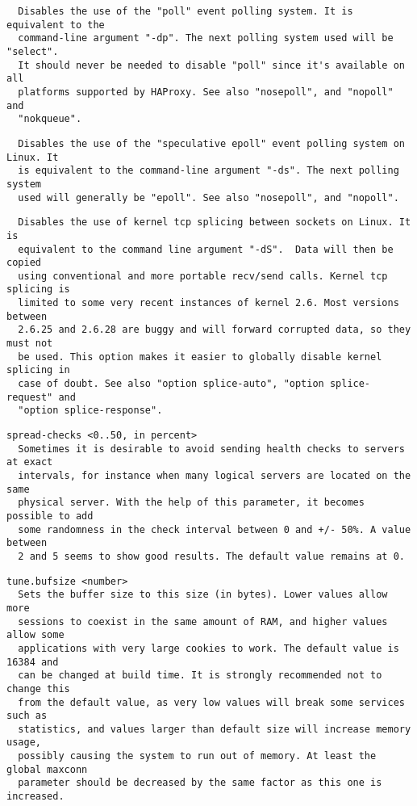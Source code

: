 \begin{verbatim}
  Disables the use of the "poll" event polling system. It is equivalent to the
  command-line argument "-dp". The next polling system used will be "select".
  It should never be needed to disable "poll" since it's available on all
  platforms supported by HAProxy. See also "nosepoll", and "nopoll" and
  "nokqueue".
\end{verbatim}

\begin{verbatim}
  Disables the use of the "speculative epoll" event polling system on Linux. It
  is equivalent to the command-line argument "-ds". The next polling system
  used will generally be "epoll". See also "nosepoll", and "nopoll".
\end{verbatim}

\begin{verbatim}
  Disables the use of kernel tcp splicing between sockets on Linux. It is
  equivalent to the command line argument "-dS".  Data will then be copied
  using conventional and more portable recv/send calls. Kernel tcp splicing is
  limited to some very recent instances of kernel 2.6. Most versions between
  2.6.25 and 2.6.28 are buggy and will forward corrupted data, so they must not
  be used. This option makes it easier to globally disable kernel splicing in
  case of doubt. See also "option splice-auto", "option splice-request" and
  "option splice-response".
\end{verbatim}

\begin{verbatim}
spread-checks <0..50, in percent>
  Sometimes it is desirable to avoid sending health checks to servers at exact
  intervals, for instance when many logical servers are located on the same
  physical server. With the help of this parameter, it becomes possible to add
  some randomness in the check interval between 0 and +/- 50%. A value between
  2 and 5 seems to show good results. The default value remains at 0.
\end{verbatim}

\begin{verbatim}
tune.bufsize <number>
  Sets the buffer size to this size (in bytes). Lower values allow more
  sessions to coexist in the same amount of RAM, and higher values allow some
  applications with very large cookies to work. The default value is 16384 and
  can be changed at build time. It is strongly recommended not to change this
  from the default value, as very low values will break some services such as
  statistics, and values larger than default size will increase memory usage,
  possibly causing the system to run out of memory. At least the global maxconn
  parameter should be decreased by the same factor as this one is increased.
\end{verbatim}

